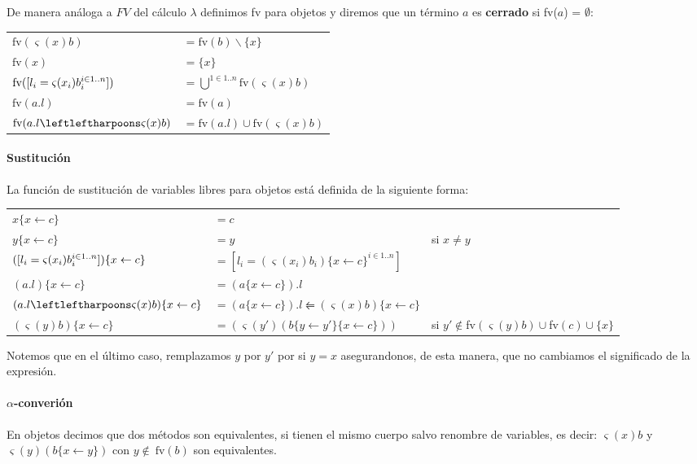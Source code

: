 De manera análoga a $FV$ del cálculo $\lambda$ definimos fv para objetos y diremos que un término $a$ es \textbf{cerrado} si fv($a$) = $\emptyset$:

\begin{center}
\begin{tabular}{ll}
	$\text{fv}(\varsigma(x)b)$ &$= \text{fv}(b)\backslash \{x\} $\\
	$\text{fv}(x)$ &$= \{x\} $\\
	$\text{fv}([l_i = \varsigma(x_i)b_i^{i\in 1..n}])$ &$=  \bigcup^{1\in 1..n} \text{fv}(\varsigma(x)b)$\\
	$\text{fv}(a.l)$ &$= \text{fv}(a) $\\
	$\text{fv}(\OORedefinicion{a.l}{x}{b})$ &$= \text{fv}(a.l)\cup \text{fv}(\varsigma(x)b) $\\
\end{tabular}
\end{center}
\paragraph{Sustitución} La función de sustitución de variables libres para objetos está definida de la siguiente forma:

\begin{center}
\begin{tabular}{lll}
	$x\{x \leftarrow c\}$ &$= c$ & \\
	$y\{x \leftarrow c\}$ &$= y$ & si $x\neq y$\\
	$([l_i = \varsigma(x_i)b_i^{i\in 1..n}])\{x \leftarrow c\}$ &$=  [l_i = (\varsigma(x_i)b_i)\{x \leftarrow c\}^{i\in 1..n}]$ & \\
	$(a.l)\{x \leftarrow c\}$ &$= (a\{x \leftarrow c\}).l $ & \\
	$(\OORedefinicion{a.l}{x}{b})\{x \leftarrow c\}$ &$= (a\{x \leftarrow c\}).l \leftleftharpoons (\varsigma(x)b)\{x \leftarrow c\} $ & \\
	$(\varsigma(y)b)\{x \leftarrow c\}$ &$= (\varsigma(y')(b\{y \leftarrow y'\}\{x \leftarrow c\})) $ & si $y'\notin$fv$(\varsigma(y)b)\cup$fv$(c)\cup\{x\}$ \\
\end{tabular}
\end{center}

Notemos que en el último caso, remplazamos $y$ por $y'$ por si $y = x$ asegurandonos, de esta manera, que no cambiamos el significado de la expresión.

\paragraph{$\alpha$-converión} En objetos decimos que dos métodos son equivalentes, si tienen el mismo cuerpo salvo renombre de variables, es decir: $\varsigma(x)b$ y $\varsigma(y)(b\{x\leftarrow y\})$ con $y\notin~\text{fv}(b)$ son equivalentes.

